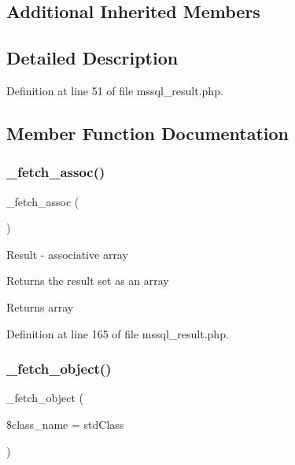 \subsection*{Additional Inherited Members}


\subsection{Detailed Description}


Definition at line 51 of file mssql\+\_\+result.\+php.



\subsection{Member Function Documentation}
\mbox{\label{class_c_i___d_b__mssql__result_a43a9a92817f1334a1c10752ec44275a0}} 
\subsubsection{\texorpdfstring{\_fetch\_assoc()}{\_fetch\_assoc()}}
{\footnotesize\ttfamily \+\_\+fetch\+\_\+assoc (\begin{DoxyParamCaption}{ }\end{DoxyParamCaption})\hspace{0.3cm}{\ttfamily [protected]}}

Result -\/ associative array

Returns the result set as an array

\begin{DoxyReturn}{Returns}
array 
\end{DoxyReturn}


Definition at line 165 of file mssql\+\_\+result.\+php.

\mbox{\label{class_c_i___d_b__mssql__result_a60806be6a9c2488820813c2a7f4fef71}} 
\subsubsection{\texorpdfstring{\_fetch\_object()}{\_fetch\_object()}}
{\footnotesize\ttfamily \+\_\+fetch\+\_\+object (\begin{DoxyParamCaption}\item[{}]{\$class\+\_\+name = {\ttfamily \textquotesingle{}stdClass\textquotesingle{}} }\end{DoxyParamCaption})\hspace{0.3cm}{\ttfamily [protected]}}

